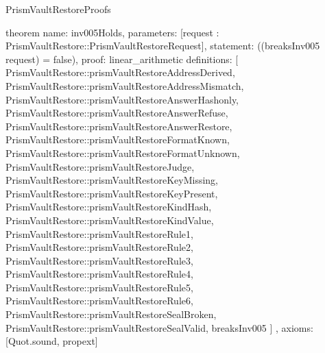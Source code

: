 \begin{lexlean}{PrismVaultRestoreProofs}
\begin{semanticmodule}
theorem{
  name: inv005Holds,
  parameters: [request : PrismVaultRestore::PrismVaultRestoreRequest],
  statement: ((breaksInv005 request) = false),
  proof: linear_arithmetic{
    definitions: [
      PrismVaultRestore::prismVaultRestoreAddressDerived,
      PrismVaultRestore::prismVaultRestoreAddressMismatch,
      PrismVaultRestore::prismVaultRestoreAnswerHashonly,
      PrismVaultRestore::prismVaultRestoreAnswerRefuse,
      PrismVaultRestore::prismVaultRestoreAnswerRestore,
      PrismVaultRestore::prismVaultRestoreFormatKnown,
      PrismVaultRestore::prismVaultRestoreFormatUnknown,
      PrismVaultRestore::prismVaultRestoreJudge,
      PrismVaultRestore::prismVaultRestoreKeyMissing,
      PrismVaultRestore::prismVaultRestoreKeyPresent,
      PrismVaultRestore::prismVaultRestoreKindHash,
      PrismVaultRestore::prismVaultRestoreKindValue,
      PrismVaultRestore::prismVaultRestoreRule1,
      PrismVaultRestore::prismVaultRestoreRule2,
      PrismVaultRestore::prismVaultRestoreRule3,
      PrismVaultRestore::prismVaultRestoreRule4,
      PrismVaultRestore::prismVaultRestoreRule5,
      PrismVaultRestore::prismVaultRestoreRule6,
      PrismVaultRestore::prismVaultRestoreSealBroken,
      PrismVaultRestore::prismVaultRestoreSealValid,
      breaksInv005
    ]
  },
  axioms: [Quot.sound, propext]
}
\end{semanticmodule}
\end{lexlean}
